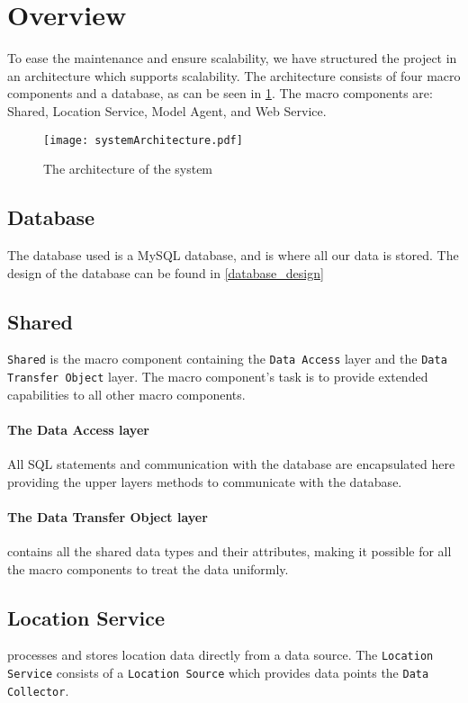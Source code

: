 \section{Overview}
To ease the maintenance and ensure scalability, we have structured the project in an architecture which supports scalability.
The architecture consists of four macro components and a database, as can be seen in \cref{fig:architecture}. The macro components are: Shared, Location Service, Model Agent, and Web Service.

\begin{figure}[H]
\texttt{[image: systemArchitecture.pdf]}
\caption{The architecture of the system}
\label{fig:architecture}
\end{figure}

\subsection*{Database} The database used is a MySQL database, and is where all our data is stored.
The design of the database can be found in \cref{database_design}


\subsection*{Shared}\texttt{Shared} is the macro component containing the \texttt{Data Access} layer and the \texttt{Data Transfer Object} layer.
The macro component's task is to provide extended capabilities to all other macro components.

\paragraph{The Data Access layer} All SQL statements and communication with the database are encapsulated here providing the upper layers methods to communicate with the database.

\paragraph{The Data Transfer Object layer} contains all the shared data types and their attributes, making it possible for all the macro components to treat the data uniformly.


\subsection*{Location Service} processes and stores location data directly from a data source. 
The \texttt{Location Service} consists of a \texttt{Location Source} which provides data points the \texttt{Data Collector}.

